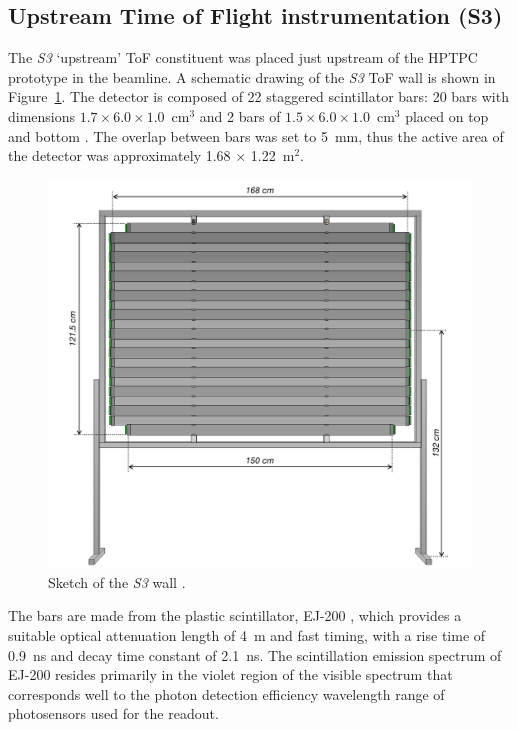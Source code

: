 \subsection{Upstream Time of Flight instrumentation (S3)}
\label{subsec:s3Exp}
The \textit{S3} `upstream' ToF constituent was placed just upstream of the HPTPC prototype in the beamline.
A schematic drawing of the \textit{S3} ToF wall is shown in Figure~\ref{fig:S3sketch}.
The detector is composed of 22 staggered scintillator bars:  20 bars with dimensions $1.7 \times 6.0 \times 1.0$~cm$^3$ and 2 bars of  $1.5 \times 6.0 \times 1.0$~cm$^3$ placed on top and bottom \cite{S3-proceedings}.
The overlap between bars was set to 5~mm, thus the active area of the detector was approximately 1.68 $\times$ 1.22~m$^2$.
\begin{figure}
  \centering
  \includegraphics[width=0.7\linewidth]{files/Figures/uToF_sketch.pdf}
  \caption{Sketch of the \textit{S3} wall \cite{S3-proceedings}.}
  \label{fig:S3sketch}
\end{figure}
The bars are made from the plastic scintillator, EJ-200 \cite{SCIONIX}, which 
provides a suitable optical attenuation length of 4~m and fast timing, with a rise time of 0.9~ns and decay time constant of 2.1~ns.
The scintillation emission spectrum of EJ-200 resides primarily in the violet region of the visible spectrum that corresponds well to the photon detection efficiency wavelength range of photosensors used for the readout. 

